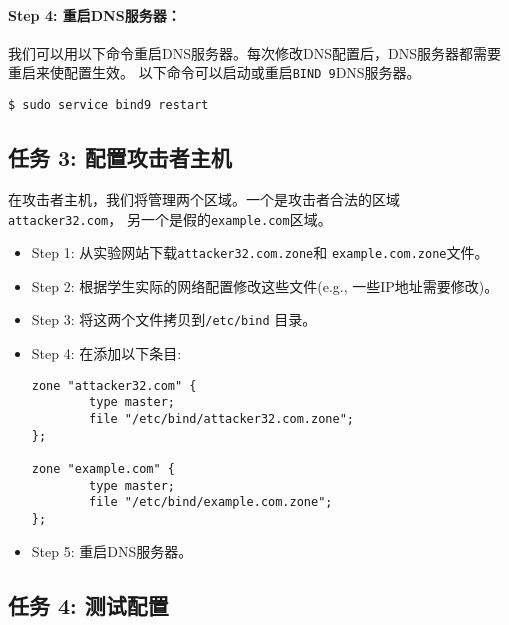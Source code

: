 \paragraph{Step 4: 重启DNS服务器：}
我们可以用以下命令重启DNS服务器。每次修改DNS配置后，DNS服务器都需要重启来使配置生效。
以下命令可以启动或重启\texttt{BIND 9}DNS服务器。

\begin{lstlisting}
$ sudo service bind9 restart
\end{lstlisting}




\subsection{任务 3: 配置攻击者主机}

在攻击者主机，我们将管理两个区域。一个是攻击者合法的区域\texttt{attacker32.com}，
另一个是假的\texttt{example.com}区域。


\begin{itemize} 
\item Step 1: 从实验网站下载\texttt{attacker32.com.zone}和
              \texttt{example.com.zone}文件。 

\item Step 2: 根据学生实际的网络配置修改这些文件(e.g., 一些IP地址需要修改)。 

\item Step 3: 将这两个文件拷贝到\texttt{/etc/bind} 目录。 

\item Step 4: 在添加以下条目:


\begin{lstlisting}
zone "attacker32.com" {
        type master;
        file "/etc/bind/attacker32.com.zone";
};

zone "example.com" {
        type master;
        file "/etc/bind/example.com.zone";
};
\end{lstlisting}


\item Step 5: 重启DNS服务器。
\end{itemize} 
 


\subsection{任务 4: 测试配置}

